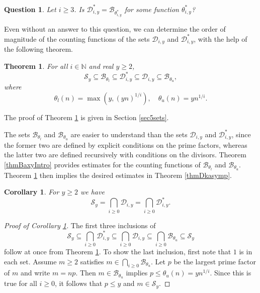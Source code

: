 \documentclass[11pt]{amsart}
\newtheorem{theorem}{Theorem}
\newtheorem{corollary}{Corollary}
\newtheorem{question}{Question}
\begin{document}
\begin{question}
Let $i\ge 3$. Is $\mathcal{D}^*_{i,y}=\mathcal{B}_{\theta^*_{i,y}}$ for some function $\theta^*_{i,y}$? 
\end{question}

Even without an answer to this question, we can determine the order of magnitude of the counting functions of the sets 
$ \mathcal{D}_{i,y}$ and $ \mathcal{D}^*_{i,y}$, with the help of the following theorem.
\begin{theorem}\label{thm5sets}
For all $i \in \mathbb{N}$ and real $y\ge 2$,
$$
\mathcal{S}_y\subseteq \mathcal{B}_{\theta_l} \subseteq \mathcal{D}^*_{i,y}  \subseteq \mathcal{D}_{i,y}  \subseteq \mathcal{B}_{\theta_u},
$$
where 
$$
\theta_l(n) = \max(y, (yn)^{1/i}), \quad \theta_u(n) = y n^{1/i}.
$$
\end{theorem}

The proof of Theorem \ref{thm5sets} is given in Section \ref{sec5sets}.

The sets $\mathcal{B}_{\theta_l}$ and $\mathcal{B}_{\theta_u}$ are easier to understand than the sets $ \mathcal{D}_{i,y} $ and $ \mathcal{D}^*_{i,y} $,
since the former two are defined by explicit conditions on the prime factors, whereas the latter two are defined recursively with conditions on the divisors.
Theorem \ref{thmBaxyIntro} provides estimates for the counting functions of $\mathcal{B}_{\theta_l}$ and $\mathcal{B}_{\theta_u}$.
Theorem \ref{thm5sets} then implies the desired estimates  in Theorem \ref{thmDkasymp}.


\begin{corollary}\label{corS}
For $y\ge 2$ we have
$$
\mathcal{S}_y =  \bigcap_{i\ge 0} \mathcal{D}_{i,y}= \bigcap_{i\ge 0} \mathcal{D}^*_{i,y} .
$$
\end{corollary}

\begin{proof}[Proof of Corollary \ref{corS}]
The first three inclusions of 
$$
\mathcal{S}_y \subseteq  \bigcap_{i\ge 0} \mathcal{D}^*_{i,y}  \subseteq  \bigcap_{i\ge 0} \mathcal{D}_{i,y}  \subseteq  \bigcap_{i\ge 0} \mathcal{B}_{\theta_u}   \subseteq \mathcal{S}_y
$$
follow at once from Theorem \ref{thm5sets}.
To show the last inclusion, first note that $1$ is in each set. Assume $m\ge 2$ satisfies $m \in \bigcap_{i\ge 0} \mathcal{B}_{\theta_u}$.
Let $p$ be the largest prime factor of $m$ and write $m=np$.
Then $m \in   \mathcal{B}_{\theta_u}$ implies $p \le \theta_u(n) = y n^{1/i}$. Since this is true for all $i\ge 0$, it follows that $p\le y$ and $m \in \mathcal{S}_y$. 
\end{proof}
\end{document}
